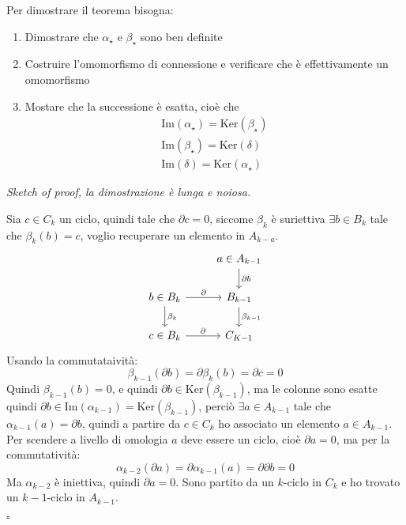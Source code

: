 \documentclass[10pt, twoside=false, x11names]{scrbook}
\newenvironment{proof}{{\textbf{Dimostrazione}:}}{\hfill $\square$}
\newcommand{\im}[1]{\mathrm{Im}( #1 )}
\renewcommand{\ker}[1]{\mathrm{Ker}( #1)}
\begin{document}
\begin{proof}
  Per dimostrare il teorema bisogna:
  \begin{enumerate}
  \item Dimostrare che $ \alpha_\star $ e $ \beta_\star $ sono ben definite
  \item Costruire l'omomorfismo di connessione e verificare che è effettivamente un omomorfismo
  \item Mostare che la successione è esatta, cioè che
    \begin{gather*}
      \im{\alpha_\star} = \ker{\beta_\star} \\
      \im{\beta_\star} = \ker{\delta} \\
      \im{\delta} = \ker{\alpha_\star}
    \end{gather*}
  \end{enumerate}
  \emph{Sketch of proof, la dimostrazione è lunga e noiosa.}

  Sia $ c \in C_k $ un ciclo, quindi tale che $ \partial c = 0 $,
  siccome $ \beta_k $ è suriettiva $ \exists b \in B_k $ tale che
  $ \beta_k(b) = c $, voglio recuperare un elemento in $ A_{k-a} $.
  \[
    \begin{tikzcd}
      {} & a \in A_{k-1} \arrow{d}{\partial b} \\
      b \in B_k \arrow{r}{\partial} \arrow{d}{\beta_k} & B_{k-1} \arrow{d}{\beta_{k-1}} \\
      c \in B_k \arrow{r}{\partial} & C_{K-1}
    \end{tikzcd}
  \]
  Usando la commutataività:
  \[
    \beta_{k-1}(\partial b) = \partial \beta_k (b) = \partial c = 0
  \]
  Quindi $ \beta_{k-1}(b) = 0 $, e quindi $ \partial b \in \ker{\beta_{k-1}} $, ma
  le colonne sono esatte quindi $ \partial b \in \im{\alpha_{k-1}} = \ker{\beta_{k-1}} $,
  perciò $ \exists a \in A_{k-1} $ tale che $ \alpha_{k-1}(a) = \partial b $, quindi
  a partire da $ c \in C_k $ ho associato un elemento $ a \in A_{k-1} $.
  Per scendere a livello di omologia $ a $ deve essere un ciclo,
  cioè $ \partial a = 0 $, ma per la commutatività:
  \[
    \alpha_{k-2}(\partial a) = \partial \alpha_{k-1}(a) = \partial \partial b = 0
  \]
  Ma $ \alpha_{k-2} $ è iniettiva, quindi $ \partial a = 0 $.
  Sono partito da un $ k $-ciclo in $ C_k $ e
  ho trovato un $ k-1 $-ciclo in $ A_{k-1} $.


\end{proof}
\end{document}

